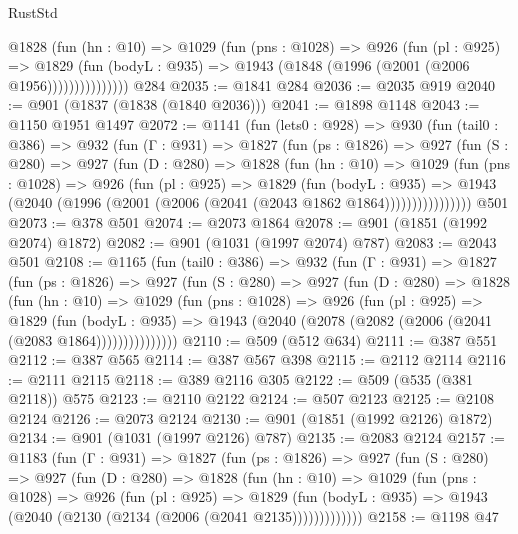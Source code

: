 \begin{lexlean}{RustStd}
\begin{coremodule}
                @1828
                  (fun (hn : @10) =>
                  @1029
                    (fun (pns : @1028) =>
                    @926
                      (fun (pl : @925) =>
                      @1829
                        (fun (bodyL : @935) =>
                        @1943 (@1848 (@1996 (@2001 (@2006 @1956)))))))))))))))
    @284
@2035 := @1841 @284
@2036 := @2035 @919
@2040 := @901 (@1837 (@1838 (@1840 @2036)))
@2041 := @1898 @1148
@2043 := @1150 @1951 @1497
@2072 := @1141
    (fun (lets0 : @928) =>
    @930
      (fun (tail0 : @386) =>
      @932
        (fun (Γ : @931) =>
        @1827
          (fun (ps : @1826) =>
          @927
            (fun (S : @280) =>
            @927
              (fun (D : @280) =>
              @1828
                (fun (hn : @10) =>
                @1029
                  (fun (pns : @1028) =>
                  @926
                    (fun (pl : @925) =>
                    @1829
                      (fun (bodyL : @935) =>
                      @1943 (@2040 (@1996 (@2001 (@2006 (@2041 (@2043 @1862 @1864))))))))))))))))
    @501
@2073 := @378 @501
@2074 := @2073 @1864
@2078 := @901 (@1851 (@1992 @2074) @1872)
@2082 := @901 (@1031 (@1997 @2074) @787)
@2083 := @2043 @501
@2108 := @1165
    (fun (tail0 : @386) =>
    @932
      (fun (Γ : @931) =>
      @1827
        (fun (ps : @1826) =>
        @927
          (fun (S : @280) =>
          @927
            (fun (D : @280) =>
            @1828
              (fun (hn : @10) =>
              @1029
                (fun (pns : @1028) =>
                @926
                  (fun (pl : @925) =>
                  @1829
                    (fun (bodyL : @935) =>
                    @1943 (@2040 (@2078 (@2082 (@2006 (@2041 (@2083 @1864)))))))))))))))
@2110 := @509 (@512 @634)
@2111 := @387 @551
@2112 := @387 @565
@2114 := @387 @567 @398
@2115 := @2112 @2114
@2116 := @2111 @2115
@2118 := @389 @2116 @305
@2122 := @509 (@535 (@381 @2118)) @575
@2123 := @2110 @2122
@2124 := @507 @2123
@2125 := @2108 @2124
@2126 := @2073 @2124
@2130 := @901 (@1851 (@1992 @2126) @1872)
@2134 := @901 (@1031 (@1997 @2126) @787)
@2135 := @2083 @2124
@2157 := @1183
    (fun (Γ : @931) =>
    @1827
      (fun (ps : @1826) =>
      @927
        (fun (S : @280) =>
        @927
          (fun (D : @280) =>
          @1828
            (fun (hn : @10) =>
            @1029
              (fun (pns : @1028) =>
              @926
                (fun (pl : @925) =>
                @1829
                  (fun (bodyL : @935) => @1943 (@2040 (@2130 (@2134 (@2006 (@2041 @2135)))))))))))))
@2158 := @1198 @47

\end{coremodule}
\end{lexlean}

